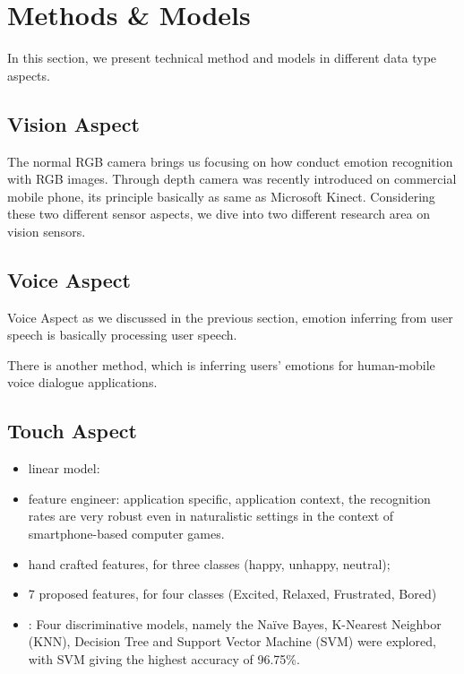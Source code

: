 \section{Methods \& Models}\label{sec:methods}

In this section, we present technical method and models in different data type aspects.

\subsection{Vision Aspect} \label{subsec:vision-model}

The normal RGB camera brings us focusing on how conduct emotion recognition with RGB images. Through depth camera was recently introduced on commercial mobile phone, its principle basically as same as Microsoft Kinect. Considering these two different sensor aspects, we dive into two different research area on vision sensors.



\cite{Mollahosseini2017}

\subsection{Voice Aspect}\label{subsec:voice-model}

Voice Aspect as we discussed in the previous section, emotion inferring from user speech is basically
processing user speech.

There is another method, which is inferring users' emotions for human-mobile voice dialogue applications.

\subsection{Touch Aspect}\label{subsec:touch-model}

\begin{itemize}
  \item linear model:
  \item feature engineer: \cite{Gao2012} application specific, application context, the recognition rates are very robust even in naturalistic settings in the context of smartphone-based computer games. 
  \item \cite{Shah2015} hand crafted features, for three classes (happy, unhappy, neutral); 
  \item \cite{bhattacharya2017predictive} 7 proposed features, for four classes (Excited, Relaxed, Frustrated, Bored)
  \item \cite{Tikadar2017}: Four discriminative models, namely the Naïve Bayes, K-Nearest Neighbor (KNN), Decision Tree and Support Vector Machine (SVM) were explored, with SVM giving the highest accuracy of 96.75\%.
\end{itemize}

